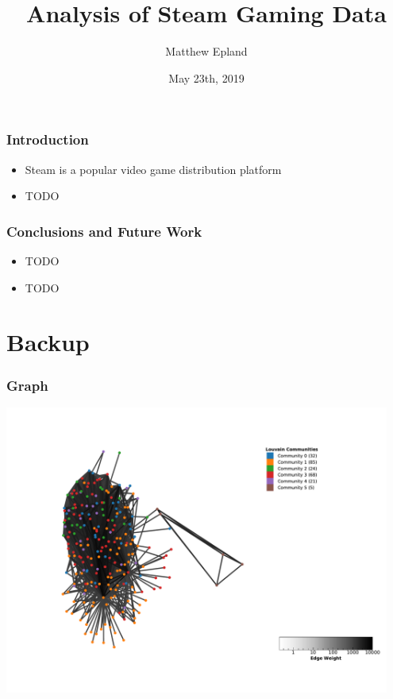 \documentclass[18pt,xcolor=table]{beamer} \usefonttheme[onlymath]{serif}
\title[Steam Analysis]{Analysis of Steam Gaming Data}
\author[Matthew Epland]{Matthew Epland}
\date{May 23th, 2019}
\begin{document}
\frame{\titlepage} 

\begin{frame}
  \frametitle{Introduction}
  \begin{itemize}
    \item Steam is a popular video game distribution platform
    \item TODO
  \end{itemize}
\end{frame}

\begin{frame}
  \frametitle{Conclusions and Future Work}
  \begin{itemize}
    \item TODO
    \item TODO
  \end{itemize}
\end{frame}

\backupbegin
\section{Backup}
\sectionpage

\begin{frame}
  \frametitle{Graph}
  \centering
  \includegraphics[width=0.95\textwidth]{../output/graph.pdf}
\end{frame}

\backupend
\end{document}
